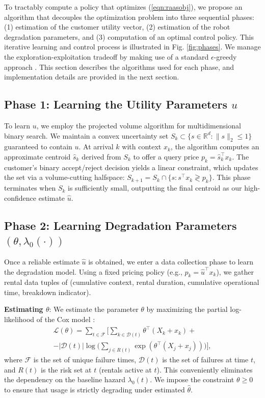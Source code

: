 \documentclass[letterpaper, 10 pt, conference]{IEEEconf}
\begin{document}
To tractably compute a policy that optimizes (\ref{eqn:raasobj}), we propose an algorithm that decouples the optimization problem into three sequential phases: (1) estimation of the customer utility vector, (2) estimation of the robot degradation parameters, and (3) computation of an optimal control policy. This iterative learning and control process is illustrated in Fig. \ref{fig:phases}. We manage the exploration-exploitation tradeoff by making use of a standard $\epsilon$-greedy approach \cite{dann2022guarantees}. This section describes the algorithms used for each phase, and implementation details are provided in the next section.

\subsection{Phase 1: Learning the Utility Parameters $u$}
To learn $u$, we employ the projected volume algorithm \cite{scheid2024incentivized, Lobel2018multidimensional} for multidimensional binary search. We maintain a convex uncertainty set $S_k \subset \{s \in \mathbb{R}^d : \|s\|_2 \leq 1\}$ guaranteed to contain $u$. At arrival $k$ with context $x_k$, the algorithm computes an approximate centroid $\widehat{s}_k$ derived from $S_k$ to offer a query price $p_k = \widehat{s}_k^\top x_k$. The customer's binary accept/reject decision yields a linear constraint, which updates the set via a volume-cutting halfspace: $S_{k+1} = S_k \cap \{s : s^\top x_k \gtrless p_k\}$. This phase terminates when $S_k$ is sufficiently small, outputting the final centroid as our high-confidence estimate $\widehat{u}$.

\subsection{Phase 2: Learning Degradation Parameters $(\theta, \lambda_0(\cdot))$}
Once a reliable estimate $\widehat{u}$ is obtained, we enter a data collection phase to learn the degradation model. Using a fixed pricing policy (e.g., $p_k = \widehat{u}^\top x_k$), we gather rental data tuples of (cumulative context, rental duration, cumulative operational time, breakdown indicator).

\textbf{Estimating ${\theta}$}: We estimate the parameter $\theta$ by maximizing the partial log-likelihood of the Cox model \cite{vittinghoff2012regression,cox1972regression}:
\begin{multline}
    \textstyle\mathcal{L}(\theta) = \sum_{t\in \mathcal{F}}\big[ \sum_{k\in\mathcal{D}(t)} \theta^\top(X_k + x_k) + \\
    \textstyle-|\mathcal{D}(t)|\log \big( \sum_{j \in R(t)} \exp(\theta^\top(X_j + x_j))\big)\big],
\end{multline}
where $\mathcal{F}$ is the set of unique failure times, $\mathcal{D}(t)$ is the set of failures at time $t$, and $R(t)$ is the risk set at $t$ (rentals active at $t$). This conveniently eliminates the dependency on the baseline hazard $\lambda_0(t)$. We impose the constraint $\theta \geq 0$ to ensure that usage is strictly degrading under estimated $\widehat\theta$. 
\end{document}
